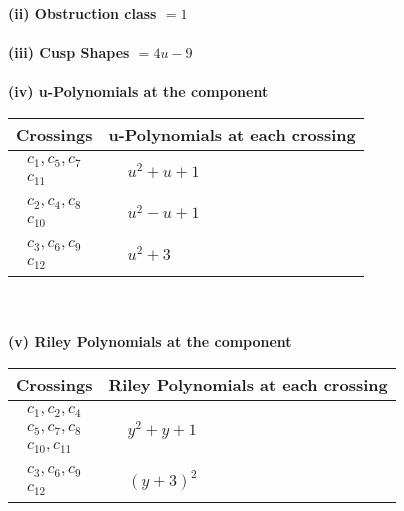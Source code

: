 \documentclass[1p]{elsarticle_modified}
\theoremstyle{definition}
\begin{document}
\flushleft \textbf{(ii) Obstruction class $= 1$}\\~\\
\flushleft \textbf{(iii) Cusp Shapes $= 4 u-9$}\\~\\
\newpage\renewcommand{\arraystretch}{1}
\flushleft \textbf{(iv) u-Polynomials at the component}\newline \\
\begin{tabular}{m{50pt}|m{274pt}}
Crossings & \hspace{64pt}u-Polynomials at each crossing \\
\hline $$\begin{aligned}c_{1},c_{5},c_{7}\\c_{11}\end{aligned}$$&$\begin{aligned}
&u^2+u+1
\end{aligned}$\\
\hline $$\begin{aligned}c_{2},c_{4},c_{8}\\c_{10}\end{aligned}$$&$\begin{aligned}
&u^2- u+1
\end{aligned}$\\
\hline $$\begin{aligned}c_{3},c_{6},c_{9}\\c_{12}\end{aligned}$$&$\begin{aligned}
&u^2+3
\end{aligned}$\\
\hline
\end{tabular}\\~\\
\newpage\renewcommand{\arraystretch}{1}
\flushleft \textbf{(v) Riley Polynomials at the component}\newline \\
\begin{tabular}{m{50pt}|m{274pt}}
Crossings & \hspace{64pt}Riley Polynomials at each crossing \\
\hline $$\begin{aligned}c_{1},c_{2},c_{4}\\c_{5},c_{7},c_{8}\\c_{10},c_{11}\end{aligned}$$&$\begin{aligned}
&y^2+y+1
\end{aligned}$\\
\hline $$\begin{aligned}c_{3},c_{6},c_{9}\\c_{12}\end{aligned}$$&$\begin{aligned}
&(y+3)^2
\end{aligned}$\\
\hline
\end{tabular}\\~\\
\end{document}
